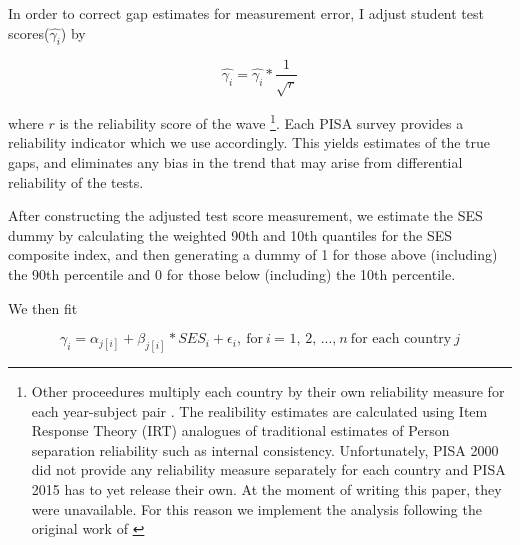 \documentclass[11pt, a4paper]{article}\usepackage[]{graphicx}\usepackage[]{color}
\begin{document}
In order to correct gap estimates for measurement error, I adjust student test scores(\begin{math} \hat{\gamma_i} \end{math}) by

\begin{equation}
\hat{\gamma_i} = \hat{\gamma_i} * \frac{1}{\sqrt{r}}
\end{equation}

where \begin{math}r\end{math} is the reliability score of the wave \footnote{Other proceedures multiply each country by their own reliability measure for each year-subject pair \citep{anna2016_global}. The realibility estimates are calculated using Item Response Theory (IRT) analogues of traditional estimates of Person separation reliability such as internal consistency. Unfortunately, PISA 2000 did not provide any reliability measure separately for each country and PISA 2015 has to yet release their own. At the moment of writing this paper, they were unavailable. For this reason we implement the analysis following the original work of \citet{reardon2011}}. Each PISA survey provides a reliability indicator which we use accordingly. This yields estimates of the true gaps, and eliminates any bias in the trend that may arise from differential reliability of the tests.

After constructing the adjusted test score measurement, we estimate the SES dummy by calculating the weighted 90th and 10th quantiles for the SES composite index, and then generating a dummy of 1 for those above (including) the 90th percentile and 0 for those below (including) the 10th percentile.

We then fit

\begin{equation}
\gamma_i = \alpha_{j[i]} + \beta_{j[i]} * SES_i + \epsilon_i,\ \text{for} \ i \ \text{= 1, 2, ...,} \ n \ \text{for each country} \ j
\end{equation}


\end{document}

